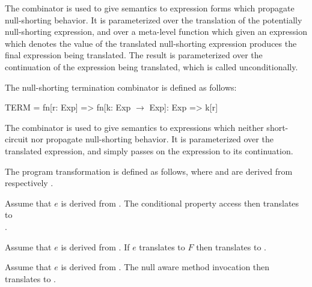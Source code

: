 \documentclass[makeidx]{article}
\begin{document}
{\LMHash{}%
The  combinator is used to give semantics to
expression forms which propagate null-shorting behavior.
It is parameterized
over the translation  of
the potentially null-shorting expression,
and over a meta-level function 
which given an expression which denotes the value of the translated
null-shorting expression produces the final expression being translated.
The result is parameterized over the continuation of
the expression being translated,
which is called unconditionally.

\LMHash{}%
The null-shorting termination combinator
is defined as follows:

\begin{metaLevelCode}
TERM = fn[r: Exp] => fn[k: Exp $\rightarrow$ Exp]: Exp => k[r]
\end{metaLevelCode}

\LMHash{}%
The  combinator is used to give semantics to
expressions which neither short-circuit nor propagate null-shorting behavior.
It is parameterized over the translated expression,
and simply passes on the expression to its continuation.

\LMHash{}%
The program transformation  is defined as follows,
where  and  are derived from
 respectively .

{ %
\def\Base#1{\textcolor{normativeColor}{#1}}
\def\Meta#1{\textcolor{metaColor}{#1}}
%
\LMHash{}%
Assume that $e$ is derived from .
The conditional property access  then translates to\\
\metaCode{SHORT[EXP(\Base{$e$}), fn[x] => x\Base{.\id}]}.
\EndCase

\LMHash{}%
Assume that $e$ is derived from .
If $e$ translates to \Meta{$F$} then  translates to
\metaCode{PASSTHRU[$F$, fn[x] => x\Base{.\id}]}.
\EndCase

\LMHash{}%
Assume that $e$ is derived from .
The null aware method invocation
 then translates to
\metaCode{SHORT[EXP(\Base{$e$}), fn[x] => %
    x\Base{.$m$<\metavar{typeArgs}>(\Meta{ARGS(\Base{\metavar{args}})})}]}.
\EndCase

}}
\end{document}
